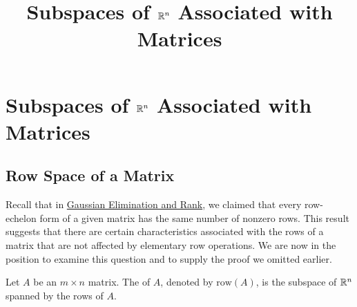 \documentclass{ximera}
\title{Subspaces of $\mathbb{R}^n$ Associated with Matrices} \license{CC BY-NC-SA 4.0}
\begin{document}
\begin{abstract}

\end{abstract}
\maketitle
\section*{Subspaces of $\mathbb{R}^n$ Associated with Matrices}
\subsection*{Row Space of a Matrix}
Recall that in \href{https://ximera.osu.edu/oerlinalg/LinearAlgebra/SYS-0030/main}{Gaussian Elimination and Rank}, we claimed that every row-echelon form of a given matrix has the same number of nonzero rows.  This result suggests that there are certain characteristics associated with the rows of a matrix that are not affected by elementary row operations.  We are now in the position to examine this question and to supply the proof we omitted earlier.
\begin{definition}\label{def:rowspace} Let $A$ be an $m\times n$ matrix.  The  of $A$, denoted by $\mbox{row}(A)$, is the subspace of $\mathbb{R}^n$ spanned by the rows of $A$.
\end{definition}
\end{document}
